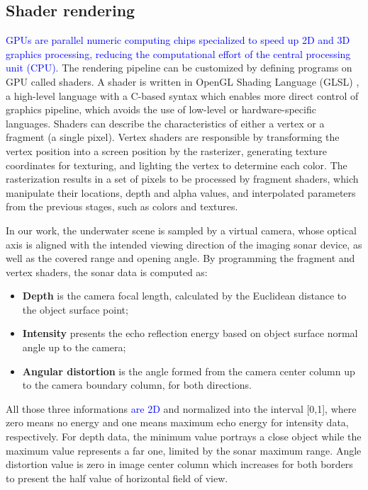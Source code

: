 \documentclass[final,5p,times]{elsarticle}
\begin{document}

\subsection{Shader rendering}
\label{dev:shader}

\textcolor{blue}{GPUs are parallel numeric computing chips specialized to speed up 2D and 3D graphics
processing, reducing the computational effort of the central processing unit (CPU).} The
rendering pipeline can be customized by defining programs on GPU called
shaders. A shader is written in OpenGL Shading Language (GLSL) \cite{rost2009},
a high-level language with a C-based syntax which enables more direct control
of graphics pipeline, which avoids the use of low-level or hardware-specific
languages. Shaders can describe the characteristics of either a vertex or a
fragment (a single pixel). Vertex shaders are responsible by transforming the
vertex position into a screen position by the rasterizer, generating texture
coordinates for texturing, and lighting the vertex to determine each color.
The rasterization results in a set of pixels to be processed by fragment
shaders, which manipulate their locations, depth and alpha values, and
interpolated parameters from the previous stages, such as colors and textures.

In our work, the underwater scene is sampled by a virtual camera, whose
optical axis is aligned with the intended viewing direction of the
imaging sonar device, as well as the covered range and opening angle.
By programming the fragment and vertex shaders, the sonar data is
computed as:

\begin{itemize}[(a)]
    \item \textbf{Depth} is the camera focal length, calculated by the
    Euclidean distance to the object surface point;
    \item \textbf{Intensity} presents the echo reflection energy based
    on object surface normal angle up to the camera;
    \item \textbf{Angular distortion} is the angle formed from the camera
    center column up to the camera boundary column, for both directions.
\end{itemize}

All those three informations \textcolor{blue}{are 2D} and normalized into the interval [0,1],
where zero means no energy and one means maximum echo energy for
intensity data, respectively. For depth data, the minimum value portrays
a close object while the maximum value represents a far one, limited by
the sonar maximum range. Angle distortion value is zero in image center
column which increases for both borders to present the half value
of horizontal field of view.
\end{document}
